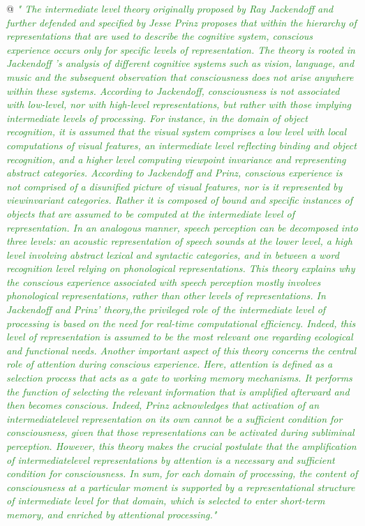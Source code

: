 \documentclass[utf8]{article}
\newenvironment{ants}
			{
			 \begin{easylist}[itemize]
			}
			{
			\end{easylist}
			}
\newcommand{\rewrite}[1]{\textcolor{ForestGreen}{\textit{"#1"}}\newline}
\begin{document}
			\begin{ants}
				@ \rewrite{
					The intermediate level theory originally proposed by Ray Jackendoff and further defended and specified by Jesse Prinz proposes that within the hierarchy of representations that are used to describe the cognitive system, conscious experience occurs only for specific levels of representation. The theory is rooted in Jackendoff ’s analysis of different cognitive systems such as vision, language, and music and the subsequent observation that consciousness does not arise anywhere within these systems. According to Jackendoff, consciousness is not associated with low-level, nor with high-level representations, but rather with those implying intermediate levels of processing. For instance, in the domain of object recognition, it is assumed that the visual system comprises a low level with local computations of visual features, an intermediate level reflecting binding and object recognition, and a higher level computing viewpoint invariance and representing abstract categories. According to Jackendoff and Prinz, conscious experience is not comprised of a disunified picture of visual features, nor is it represented by viewinvariant categories. Rather it is composed of bound and specific instances of objects that are assumed to be computed at the intermediate level of representation. In an analogous manner, speech perception can be decomposed into three levels: an acoustic representation of speech sounds at the lower level, a high level involving abstract lexical and syntactic categories, and in between a word recognition level relying on phonological representations. This theory explains why the conscious experience associated with speech perception mostly involves phonological representations, rather than other levels of representations. In Jackendoff and Prinz’ theory,the privileged role of the intermediate level of processing is based on the need for real-time computational efficiency. Indeed, this level of representation is assumed to be the most relevant one regarding ecological and functional needs. Another important aspect of this theory concerns the central role of attention during conscious experience. Here, attention is defined as a selection process that acts as a gate to working memory mechanisms. It performs the function of selecting the relevant information that is amplified afterward and then becomes conscious. Indeed, Prinz acknowledges that activation of an intermediatelevel representation on its own cannot be a sufficient condition for consciousness, given that those representations can be activated during subliminal perception. However, this theory makes the crucial postulate that the amplification of intermediatelevel representations by attention is a necessary and sufficient condition for consciousness. In sum, for each domain of processing, the content of consciousness at a particular moment is supported by a representational structure of intermediate level for that domain, which is selected to enter short-term memory, and enriched by attentional processing.} \cite{banks2009encyclopedia}
				

\end{ants}
\end{document}
